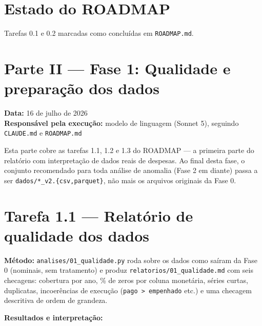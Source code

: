 \documentclass[11pt,a4paper]{article}
\begin{document}
\section{Estado do ROADMAP}

Tarefas 0.1 e 0.2 marcadas como concluídas em \texttt{ROADMAP.md}.

\clearpage
\section*{Parte II --- Fase 1: Qualidade e preparação dos dados}

\noindent\textbf{Data:} 16 de julho de 2026 \\
\textbf{Responsável pela execução:} modelo de linguagem (Sonnet 5), seguindo \texttt{CLAUDE.md} e \texttt{ROADMAP.md}

\bigskip
\noindent Esta parte cobre as tarefas 1.1, 1.2 e 1.3 do ROADMAP --- a
primeira parte do relatório com interpretação de dados reais de despesas.
Ao final desta fase, o conjunto recomendado para toda análise de anomalia
(Fase 2 em diante) passa a ser \texttt{dados/*\_v2.\{csv,parquet\}}, não
mais os arquivos originais da Fase 0.

\section{Tarefa 1.1 --- Relatório de qualidade dos dados}

\textbf{Método:} \texttt{analises/01\_qualidade.py} roda sobre os dados
como saíram da Fase 0 (nominais, sem tratamento) e produz
\texttt{relatorios/01\_qualidade.md} com seis checagens: cobertura por
ano, \% de zeros por coluna monetária, séries curtas, duplicatas,
incoerências de execução (\texttt{pago > empenhado} etc.) e uma checagem
descritiva de ordem de grandeza.

\textbf{Resultados e interpretação:}
\end{document}
